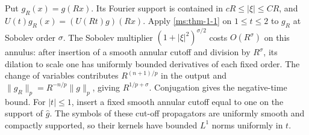 Put $g_R(x)=g(Rx)$. Its Fourier support is contained in $cR\le|\xi|\le CR$, and $U(t)g_R(x)=(U(Rt)g)(Rx)$. Apply \ref{ms:thm-1-1} on $1\le t\le2$ to $g_R$ at Sobolev order $\sigma$. The Sobolev multiplier $(1+|\xi|^2)^{\sigma/2}$ costs $O(R^\sigma)$ on this annulus: after insertion of a smooth annular cutoff and division by $R^\sigma$, its dilation to scale one has uniformly bounded derivatives of each fixed order. The change of variables contributes $R^{(n+1)/p}$ in the output and $\|g_R\|_p=R^{-n/p}\|g\|_p$, giving $R^{1/p+\sigma}$. Conjugation gives the negative-time bound. For $|t|\le1$, insert a fixed smooth annular cutoff equal to one on the support of $\widehat g$. The symbols of these cut-off propagators are uniformly smooth and compactly supported, so their kernels have bounded $L^1$ norms uniformly in $t$.
